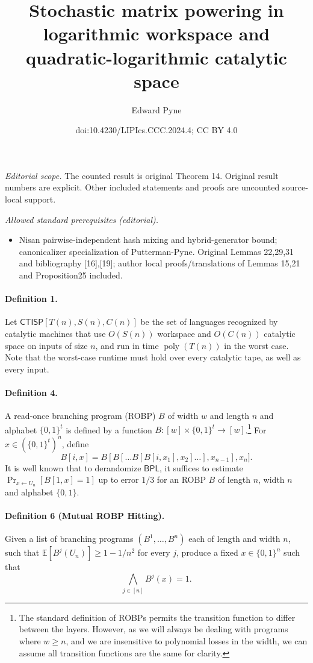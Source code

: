 \documentclass[10pt,a4paper]{article}
\title{Stochastic matrix powering in logarithmic workspace and quadratic-logarithmic catalytic space}
\author{Edward Pyne}
\date{doi:10.4230/LIPIcs.CCC.2024.4; CC BY 4.0}
\begin{document}
\maketitle
\noindent\textit{Editorial scope.} The counted result is original Theorem 14. Original result numbers are explicit. Other included statements and proofs are uncounted source-local support.\par\medskip
\noindent\textit{Allowed standard prerequisites (editorial).}\begin{itemize}
\item Nisan pairwise-independent hash mixing and hybrid-generator bound; canonicalizer specialization of Putterman-Pyne. Original Lemmas 22,29,31 and bibliography [16],[19]; author local proofs/translations of Lemmas 15,21 and Proposition25 included.
\end{itemize}\medskip
\paragraph{Definition 1.} Let $\mathsf{CTISP}[T(n),S(n),C(n)]$ be the set of languages recognized by catalytic machines that use $O(S(n))$ workspace and $O(C(n))$ catalytic space on inputs of size $n$, and run in time $\operatorname{poly}(T(n))$ in the worst case.
Note that the worst-case runtime must hold over every catalytic tape, as well as every input.
\paragraph{Definition 4.} A read-once branching program (ROBP) $B$ of width $w$ and length $n$ and alphabet $\{0,1\}^t$ is defined by a function $B:[w]\times\{0,1\}^t\to[w]$.\footnote{The standard definition of ROBPs permits the transition function to differ between the layers. However, as we will always be dealing with programs where $w\geq n$, and we are insensitive to polynomial losses in the width, we can assume all transition functions are the same for clarity.} For $x\in(\{0,1\}^t)^n$, define
\[B[i,x]=B[B[\ldots B[B[i,x_1],x_2]\ldots],x_{n-1}],x_n].\]
It is well known that to derandomize $\mathsf{BPL}$, it suffices to estimate $\Pr_{x\leftarrow U_n}[B[1,x]=1]$ up to error $1/3$ for an ROBP $B$ of length $n$, width $n$ and alphabet $\{0,1\}$.
\paragraph{Definition 6 (Mutual ROBP Hitting).} Given a list of branching programs $(B^1,\ldots,B^n)$ each of length and width $n$, such that $\mathbb{E}[B^j(U_n)]\geq1-1/n^2$ for every $j$, produce a fixed $x\in\{0,1\}^n$ such that
\[\bigwedge_{j\in[n]}B^j(x)=1.\]
\end{document}
